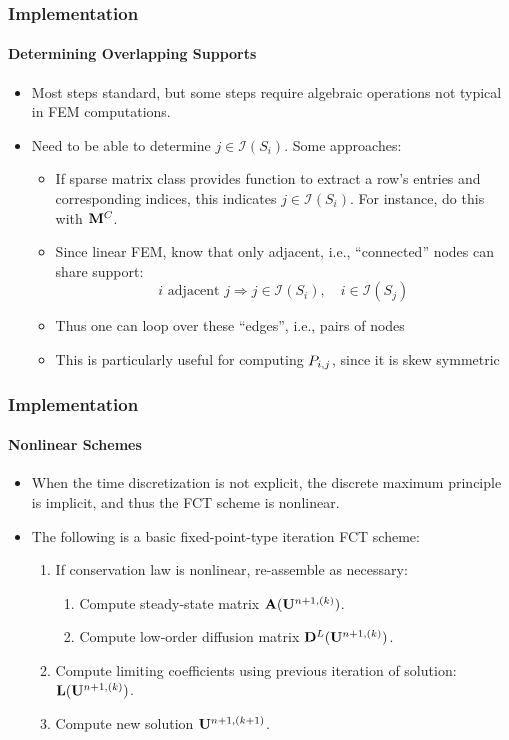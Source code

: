 \documentclass{beamer}
\begin{document}
\begin{frame}
\frametitle{Implementation}
\framesubtitle{Determining Overlapping Supports}

\begin{itemize}
   \item Most steps standard, but some steps require algebraic operations
      not typical in FEM computations.
   \item Need to be able to determine $j\in\mathcal{I}(S_i)$.
      Some approaches:
      \begin{itemize}
         \item If sparse matrix class provides function to extract
            a row's entries and corresponding indices, this indicates
            $j\in\mathcal{I}(S_i)$. For instance, do this with $\mathbf{M}^C$.
         \item Since linear FEM, know that only adjacent, i.e., ``connected''
            nodes can share support:
            \[i \mbox{ adjacent } j\Rightarrow j\in\mathcal{I}(S_i),\quad
               i\in\mathcal{I}(S_j)\]
            \item Thus one can loop over these ``edges'', i.e., pairs of nodes
            \item This is particularly useful for computing $\correctionfluxij$, since it
               is skew symmetric
      \end{itemize}
\end{itemize}

\end{frame}
\begin{frame}
\frametitle{Implementation}
\framesubtitle{Nonlinear Schemes}

\begin{itemize}
   \item When the time discretization is not explicit, the discrete maximum
      principle is implicit, and thus the FCT scheme is nonlinear.
   \item The following is a basic fixed-point-type iteration FCT scheme:
      \begin{enumerate}
         \item If conservation law is nonlinear, re-assemble as necessary:
            \begin{enumerate}
               \item Compute steady-state matrix $\ssmatrix(\solutionvector^{n+1,(k)})$.
               \item Compute low-order diffusion matrix $\diffusionmatrix^L(\solutionvector^{n+1,(k)})$.
            \end{enumerate}
         \item Compute limiting coefficients using previous iteration of
            solution: $\mathbf{L}(\mathbf{U}^{n+1,(k)})$.
         \item Compute new solution $\mathbf{U}^{n+1,(k+1)}$.
      \end{enumerate}
\end{itemize}

\end{frame}
\end{document}
